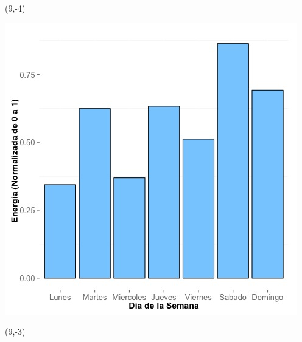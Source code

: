 \documentclass{article}\usepackage[]{graphicx}\usepackage[]{color}
\newenvironment{knitrout}{}{} %
\begin{document}
 \begin{textblock}{1}(9,-4)
\begin{minipage}{20em}
\begingroup

\endgroup
\end{minipage}
\end{textblock}


\begin{knitrout}
\color{fgcolor}
\includegraphics[scale=0.65]{figure/A3_day_of_week_plot} 
\end{knitrout}


 \begin{textblock}{1}(9,-3)
\begin{minipage}{20em}
\begingroup

\endgroup
\end{minipage}
\end{textblock}
\end{document}
